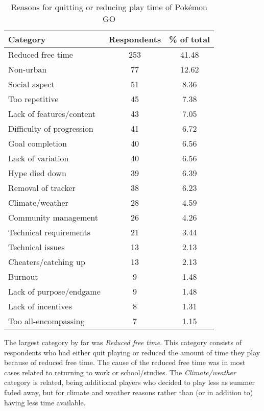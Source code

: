 \begin{table}[h]
	\centering
	\begin{tabular}{|l|c|c|}
		\hline
		\textbf{Category} & \textbf{Respondents} & \textbf{\% of total}\\
		\hline\hline
		Reduced free time & 253 & 41.48\\\hline
		Non-urban & 77 & 12.62\\\hline
		Social aspect & 51 & 8.36\\\hline
		Too repetitive & 45 & 7.38\\\hline
		Lack of features/content & 43 & 7.05\\\hline
		Difficulty of progression & 41 & 6.72\\\hline
		Goal completion & 40 & 6.56\\\hline
		Lack of variation & 40 & 6.56\\\hline
		Hype died down & 39 & 6.39\\\hline
		Removal of tracker & 38 & 6.23\\\hline
		Climate/weather & 28 & 4.59\\\hline
		Community management & 26 & 4.26\\\hline
		Technical requirements & 21 & 3.44\\\hline
		Technical issues & 13 & 2.13\\\hline
		Cheaters/catching up & 13 & 2.13\\\hline
		Burnout & 9 & 1.48\\\hline
		Lack of purpose/endgame & 9 & 1.48\\\hline
		Lack of incentives & 8 & 1.31\\\hline
		Too all-encompassing & 7 & 1.15\\\hline
	\end{tabular}
	\caption{Reasons for quitting or reducing play time of Pokémon GO}
	\label{tbl:reasons-for-quitting}
\end{table}

The largest category by far was \emph{Reduced free time}.  This category consists of respondents who had either quit playing or reduced the amount of time they play because of reduced free time. The cause of the reduced free time was in most cases related to returning to work or school/studies. The \emph{Climate/weather} category is related, being additional players who decided to play less as summer faded away, but for climate and weather reasons rather than (or in addition to) having less time available.


